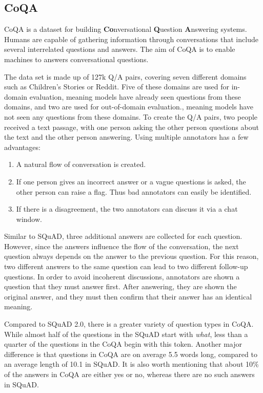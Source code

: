 \documentclass[]{krantz}
\providecommand{\tightlist}{%
  \setlength{\itemsep}{0pt}\setlength{\parskip}{0pt}}
\begin{document}
\flushleft

\hypertarget{coqa}{%
\subsection{CoQA}\label{coqa}}

CoQA is a dataset for building \textbf{Co}nversational \textbf{Q}uestion \textbf{A}nswering systems. Humans are capable of gathering information through conversations that include several interrelated questions and answers. The aim of CoQA is to enable machines to answers conversational questions.

The data set is made up of 127k Q/A pairs, covering seven different domains such as Children's Stories or Reddit. Five of these domains are used for in-domain evaluation, meaning models have already seen questions from these domains, and two are used for out-of-domain evaluation., meaning models have not seen any questions from these domains. To create the Q/A pairs, two people received a text passage, with one person asking the other person questions about the text and the other person answering. Using multiple annotators has a few advantages:

\begin{enumerate}
\def\labelenumi{\arabic{enumi}.}
\tightlist
\item
  A natural flow of conversation is created.
\item
  If one person gives an incorrect answer or a vague questions is asked, the other person can raise a flag. Thus bad annotators can easily be identified.
\item
  If there is a disagreement, the two annotators can discuss it via a chat window.
\end{enumerate}

Similar to SQuAD, three additional answers are collected for each question. However, since the answers influence the flow of the conversation, the next question always depends on the answer to the previous question. For this reason, two different answers to the same question can lead to two different follow-up questions. In order to avoid incoherent discussions, annotators are shown a question that they must answer first. After answering, they are shown the original answer, and they must then confirm that their answer has an identical meaning.

Compared to SQuAD 2.0, there is a greater variety of question types in CoQA. While almost half of the questions in the SQuAD start with \emph{what}, less than a quarter of the questions in the CoQA begin with this token. Another major difference is that questions in CoQA are on average 5.5 words long, compared to an average length of 10.1 in SQuAD. It is also worth mentioning that about 10\% of the answers in CoQA are either yes or no, whereas there are no such answers in SQuAD.
\end{document}
